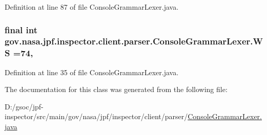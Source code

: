 Definition at line 87 of file Console\+Grammar\+Lexer.\+java.

\subsubsection[{\texorpdfstring{WS}{WS}}]{\setlength{\rightskip}{0pt plus 5cm}final int gov.\+nasa.\+jpf.\+inspector.\+client.\+parser.\+Console\+Grammar\+Lexer.\+WS =74\hspace{0.3cm}{\ttfamily [static]}, {\ttfamily [package]}}\hypertarget{classgov_1_1nasa_1_1jpf_1_1inspector_1_1client_1_1parser_1_1_console_grammar_lexer_aae0a260b14d39a83164da8aeae88f139}{}\label{classgov_1_1nasa_1_1jpf_1_1inspector_1_1client_1_1parser_1_1_console_grammar_lexer_aae0a260b14d39a83164da8aeae88f139}


Definition at line 35 of file Console\+Grammar\+Lexer.\+java.



The documentation for this class was generated from the following file\+:\begin{DoxyCompactItemize}
\item 
D\+:/gsoc/jpf-\/inspector/src/main/gov/nasa/jpf/inspector/client/parser/\hyperlink{_console_grammar_lexer_8java}{Console\+Grammar\+Lexer.\+java}\end{DoxyCompactItemize}
